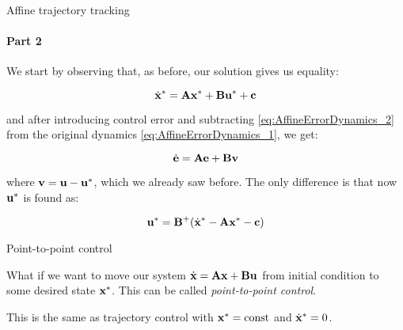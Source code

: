 \documentclass{beamer}
\begin{document}
\begin{frame}{Affine trajectory tracking}
\framesubtitle{Part 2}
\begin{flushleft}

We start by observing that, as before, our solution gives us equality:

\begin{equation}
\label{eq:AffineErrorDynamics_2}
    \dot{\mathbf{x}}^* = \mathbf{A}\mathbf{x}^* + \mathbf{B}\mathbf{u}^* + \mathbf{c}
\end{equation}

and after introducing control error and subtracting \eqref{eq:AffineErrorDynamics_2} from the original dynamics \eqref{eq:AffineErrorDynamics_1}, we get:

\begin{equation}
    \dot{\mathbf{e}} = \mathbf{A}\mathbf{e} + \mathbf{B}\mathbf{v}
\end{equation}

where $\mathbf{v} = \mathbf{u} - \mathbf{u}^*$, which we already saw before. The only difference is that now $\mathbf{u}^*$ is found as:

\begin{equation}
    \mathbf{u}^* = \mathbf{B}^+(\dot{\mathbf{x}}^* - \mathbf{A}\mathbf{x}^* - \mathbf{c})
\end{equation}

\end{flushleft}
\end{frame}




\begin{frame}{Point-to-point control}
\begin{flushleft}

What if we want to move our system $\dot{\mathbf{x}} = \mathbf{A}\mathbf{x} + \mathbf{B}\mathbf{u}$ from initial condition to some desired state $\mathbf{x}^*$. This can be called \emph{point-to-point control}.

\bigskip

This is the same as trajectory control with $\mathbf{x}^* = \text{const}$ and $\dot{\mathbf{x}}^* = 0$.


%
%
%

\end{flushleft}
\end{frame}
\end{document}
